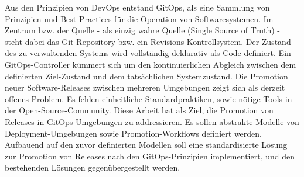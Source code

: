 
\noindent
Aus den Prinzipien von DevOps entstand GitOps,
als eine Sammlung von Prinzipien und Best Practices
für die Operation von Softwaresystemen. Im Zentrum
bzw. der Quelle - als einzig wahre Quelle (Single Source of Truth) -
steht dabei das Git-Repository bzw. ein Revisions-Kontrollsystem.
Der Zustand des zu verwaltenden Systems wird
vollständig deklarativ als Code definiert. Ein GitOps-Controller
kümmert sich um den kontinuierlichen Abgleich zwischen dem
definierten Ziel-Zustand und dem tatsächlichen Systemzustand.
Die Promotion neuer Software-Releases zwischen mehreren Umgebungen
zeigt sich als derzeit offenes Problem.
Es fehlen einheitliche Standardpraktiken, sowie nötige Tools in der Open-Source-Community.
Diese Arbeit hat als Ziel,
die Promotion von Releases in GitOps-Umgebungen
zu addressieren.
Es sollen abstrakte Modelle von Deployment-Umgebungen
sowie Promotion-Workflows definiert werden.
Aufbauend auf den zuvor definierten Modellen soll eine
standardisierte Lösung zur Promotion von Releases
nach den GitOps-Prinzipien implementiert,
und den bestehenden Lösungen gegenübergestellt werden.




